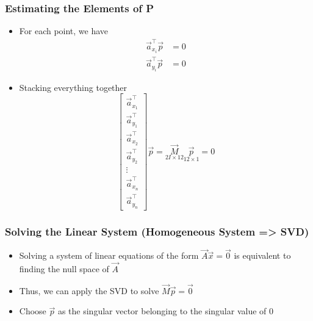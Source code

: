 \begin{frame}
\begin{center}
  \end{center}

\end{frame}


\begin{frame}
  \frametitle{Estimating the Elements of P}

  \begin{itemize}
    \item For each point, we have
    \begin{align*}
        \vec{a}_{x_i}^{\top} \vec{p} &= 0 \\
        \vec{a}_{y_i}^{\top} \vec{p} &= 0
    \end{align*}
    \item Stacking everything together
    \begin{equation*}
      \begin{bmatrix}
        \vec{a}_{x_1}^{\top} \\
        \vec{a}_{y_1}^{\top} \\
        \vec{a}_{x_2}^{\top} \\
        \vec{a}_{y_2}^{\top} \\
        \vdots \\
        \vec{a}_{x_n}^{\top} \\
        \vec{a}_{y_n}^{\top}
      \end{bmatrix} \vec{p} = \underset{2I\times 12}{\vec{M}} \underset{12\times1}{\vec{p}} = 0
    \end{equation*}
  \end{itemize}

\end{frame}


\begin{frame}
  \frametitle{Solving the Linear System (Homogeneous System => SVD)}
  \begin{itemize}
    \item Solving a system of linear equations of the form $\vec{A}\vec{x} = \vec{0}$ is equivalent to finding the null space of $\vec{A}$
    \item Thus, we can apply the SVD to solve $\vec{M}\vec{p} = \vec{0}$
    \item Choose $\vec{p}$ as the singular vector belonging to the singular value of 0
  \end{itemize}
\end{frame}

